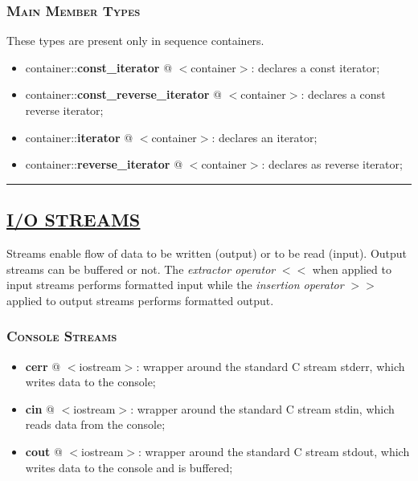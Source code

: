 \documentclass[10pt]{article}
\begin{document}
\begin{multicols*}{4}
{\subsubsection*{\textsc{Main Member Types}} 
\noindent These types are present only in sequence containers.

\begin{itemize}[leftmargin=*,topsep=0.25pt]
  \setlength\itemsep{-1.8pt}
	\item container::\textbf{const\_iterator} @ $<$container$>$: declares a const iterator;
	\item container::\textbf{const\_reverse\_iterator} @ $<$container$>$: declares a const reverse iterator;
	\item container::\textbf{iterator} @ $<$container$>$: declares an iterator;
	\item container::\textbf{reverse\_iterator} @ $<$container$>$: declares as reverse iterator;
\end{itemize}


}


\par\noindent\rule{197pt}{0.4pt}

{\color{Blue}
\subsection*{\href{https://en.cppreference.com/w/cpp/io}{\underline{I/O STREAMS}}}	
\noindent
Streams enable flow of data to be written (output) or to be read (input). Output streams can be buffered or not.
The \emph{extractor operator} $<<$ when applied to input streams performs formatted input while the \emph{insertion operator} $>>$ applied to output streams performs formatted output. 

\subsubsection*{\textsc{Console Streams}} 
\begin{itemize}[leftmargin=*,topsep=0.25pt]
  \setlength\itemsep{-1.8pt}
	\item \textbf{cerr} @ $<$iostream$>$: wrapper around the standard C stream stderr, which writes data to the console;
	\item \textbf{cin} @ $<$iostream$>$: wrapper around the standard C stream stdin, which reads data from the console;
	\item \textbf{cout} @ $<$iostream$>$: wrapper around the standard C stream stdout, which writes data to the console and is buffered;
\end{itemize}

}
\end{multicols*}
\end{document}
